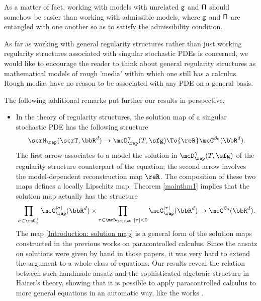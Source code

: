 As a matter of fact, working with models with unrelated $\sf g$ and $\sf \Pi$ should somehow be easier than working with admissible models, where $\sf g$ and $\sf \Pi$ are entangled with one another so as to satisfy the admissibility condition.

As far as working with general regularity structures rather than just working regularity structures associated with singular stochastic PDEs is concerned, we would like to encourage the reader to think about general regularity structures as mathematical models of rough 'media' within which one still has a calculus. Rough medias have no reason to be associated with any PDE on a general basis.

The following additional remarks put further our results in perspective.
\begin{itemize}
	\item In the theory of regularity structures, the solution map of a singular stochastic PDE has the following structure
\[
\scrM_\rap(\scrT,\bbR^d) \to \mcD_\rap^\gamma(T,\sfg) \To{\reR} \mcC^{\beta_0}(\bbR^d).
\]
The first arrow associates to a model the solution in $\mcD_\rap^\gamma(T,\sfg)$ of the regularity structure counterpart of the equation; the second arrow involves the model-dependent reconstruction map $\reR$. The composition of these two maps defines a locally Lipschitz map. Theorem \ref{mainthm1} implies that the solution map actually has the structure
\begin{align}\label{Introduction: solution map}
\prod_{\sigma\in\mcG_\circ^+} \mcC_\rap^{|\sigma|}(\bbR^d) \times \prod_{\tau\in\mcB_\sbullet,\,|\tau|<0} \mcC_\rap^{|\tau|}(\bbR^d)
\to \mcC^{\beta_0}(\bbR^d).
\end{align}
The map \eqref{Introduction: solution map} is a general form of the solution maps constructed in the previous works \cite{GIP, BB16} on paracontrolled calculus. Since the ansatz on solutions were given by hand in those papers, it was very hard to extend the argument to a whole class of equations. Our results reveal the relation between such handmade ansatz and the sophisticated algebraic structure in Hairer's theory, showing that it is possible to apply paracontrolled calculus to more general equations in an automatic way, like the works \cite{Hai, BHZ, CH16, BCCH18}.
	

\end{itemize}
